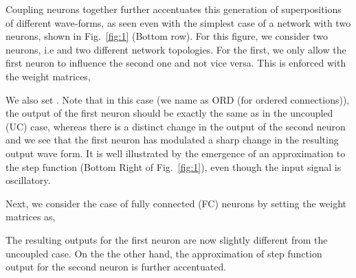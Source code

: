 \documentclass{article} \usepackage{iclr2021_conference,times}
\newcommand{\fref}[1] {Fig.~\ref{#1}}
\begin{document}
Coupling neurons together further accentuates this generation of superpositions of different wave-forms, as seen even with the simplest case of a network with two neurons, shown in \fref{fig:1} (Bottom row). For this figure, we consider two neurons, i.e  and two different network topologies. For the first, we only allow the first neuron to influence the second one and not vice versa. This is enforced with the weight matrices,

We also set . Note that in this case (we name as ORD (for ordered connections)), the output of the first neuron should be exactly the same as in the uncoupled (UC) case, whereas there is a distinct change in the output of the second neuron and we see that the first neuron has modulated a sharp change in the resulting output wave form. It is well illustrated by the emergence of an approximation to the step function (Bottom Right of \fref{fig:1}), even though the input signal is oscillatory. 

Next, we consider the case of fully connected (FC) neurons by setting the weight matrices as,

The resulting outputs for the first neuron are now slightly different from the uncoupled case. On the the other hand, the approximation of step function output for the second neuron is further accentuated. 
\end{document}

